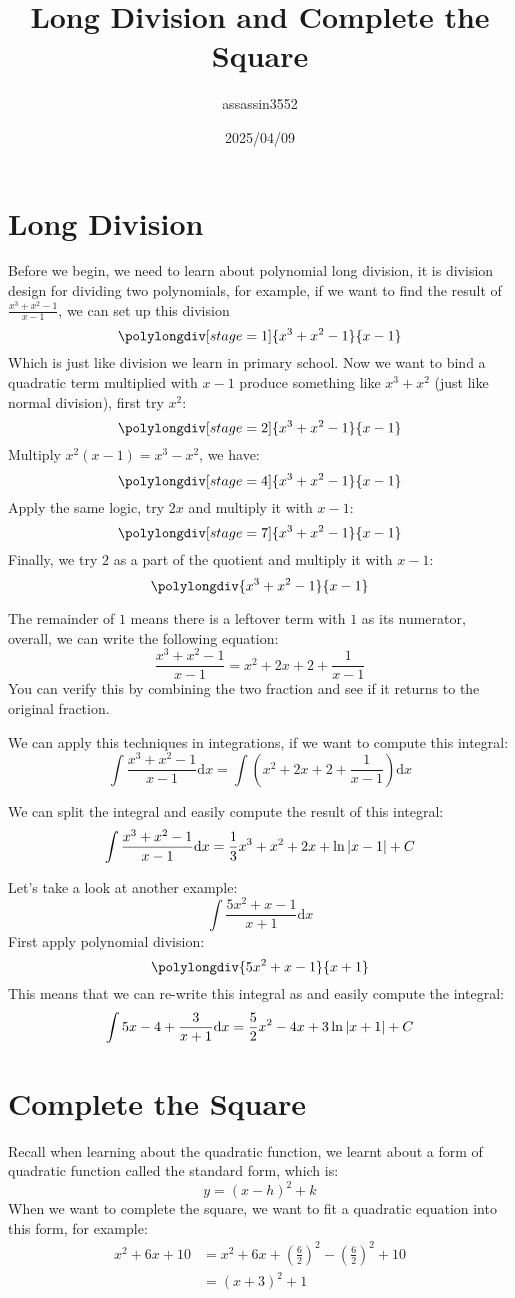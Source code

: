 \documentclass{article}
\title{Long Division and Complete the Square}
\author{assassin3552}
\date{2025/04/09}
\numberwithin{equation}{section}
\begin{document}
\maketitle

\section{Long Division}
Before we begin, we need to learn about polynomial long division,
it is division design for dividing two polynomials, for example, 
if we want to find the result of $\displaystyle \frac{x^3+x^2-1}{x-1}$, 
we can set up this division
\[
    \polylongdiv[stage=1]{x^3+x^2-1}{x-1}
\]
Which is just like division we learn in primary school. Now we want to bind a quadratic term multiplied with $x-1$ produce something
like $x^3 + x^2$ (just like normal division), first try $x^2$:
\[
    \polylongdiv[stage=2]{x^3+x^2-1}{x-1}
\]
Multiply $x^2(x-1) = x^3 -x^2$, we have:
\[
    \polylongdiv[stage=4]{x^3+x^2-1}{x-1}
\]
Apply the same logic, try $2x$ and multiply it with $x-1$:
\[
    \polylongdiv[stage=7]{x^3+x^2-1}{x-1}
\]
Finally, we try $2$ as a part of the quotient and multiply it with $x-1$:
\[
    \polylongdiv{x^3+x^2-1}{x-1}
\]
\newpage

The remainder of $1$ means there is a leftover term with $1$ as its numerator,
overall, we can write the following equation:
\[
\frac{x^3+x^2-1}{x-1} = x^2+2x+2 + \frac{1}{x-1}
\]
You can verify this by combining the two fraction and see if it returns 
to the original fraction.

We can apply this techniques in integrations, if we want to compute this integral:
\[
\int \frac{x^3+x^2-1}{x-1} \mathrm{d}x = \int \left(x^2+2x+2 + \frac{1}{x-1}\right) \mathrm{d}x
\]

We can split the integral and easily compute the result of this integral:
\[
\int \frac{x^3+x^2-1}{x-1} \mathrm{d}x = \frac{1}{3}x^3 + x^2 + 2x + \ln\abs{x-1} + C
\]

Let's take a look at another example:
\[
\int \frac{5x^2 + x - 1}{x + 1}\mathrm{d}x
\]
First apply polynomial division:
\[
    \polylongdiv{5x^2 + x - 1}{x + 1}
\]
This means that we can re-write this integral as and easily compute the integral:
\[
\int 5x - 4 + \frac{3}{x+1} \mathrm{d}x = \frac{5}{2}x^2 - 4x + 3\ln\abs{x+1} + C
\]

\section{Complete the Square}
Recall when learning about the quadratic function, we learnt about a form of quadratic function called
the standard form, which is:
\[
y = (x-h)^2 + k
\]
When we want to complete the square, we want to fit a quadratic equation into this form, for example:
\begin{align*}
    x^2 + 6x + 10 &= x^2 + 6x + \left(\frac{6}{2}\right)^2 - \left(\frac{6}{2}\right)^2 + 10\\
    &= (x+3)^2 + 1\\
\end{align*}
\end{document}

